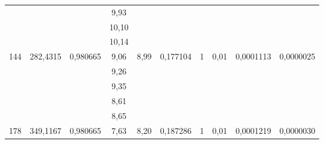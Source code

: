 \documentclass[a4paper, 12pt]{article}
\begin{document}
\begin{table}[h!]
\begin{tabular}{|c|c|c|c|c|c|c|c|c|c|}
                     &                           &                           & 9,93  &                                &                                   &                    &                       &                            &                              \\ \cline{4-4}
                     &                           &                           & 10,10 &                                &                                   &                    &                       &                            &                              \\ \cline{4-4}
                     &                           &                           & 10,14 &                                &                                   &                    &                       &                            &                              \\ \hline
\multirow{5}{*}{144} & \multirow{5}{*}{282,4315} & \multirow{5}{*}{0,980665} & 9,06  & \multirow{5}{*}{8,99}          & \multirow{5}{*}{0,177104}         & \multirow{5}{*}{1} & \multirow{5}{*}{0,01} & \multirow{5}{*}{0,0001113} & \multirow{5}{*}{0,0000025}   \\ \cline{4-4}
                     &                           &                           & 9,26  &                                &                                   &                    &                       &                            &                              \\ \cline{4-4}
                     &                           &                           & 9,35  &                                &                                   &                    &                       &                            &                              \\ \cline{4-4}
                     &                           &                           & 8,61  &                                &                                   &                    &                       &                            &                              \\ \cline{4-4}
                     &                           &                           & 8,65  &                                &                                   &                    &                       &                            &                              \\ \hline
\multirow{5}{*}{178} & \multirow{5}{*}{349,1167} & \multirow{5}{*}{0,980665} & 7,63  & \multirow{5}{*}{8,20}          & \multirow{5}{*}{0,187286}         & \multirow{5}{*}{1} & \multirow{5}{*}{0,01} & \multirow{5}{*}{0,0001219} & \multirow{5}{*}{0,0000030}   \\ \cline{4-4}

\end{tabular}
\end{table}
\end{document}
